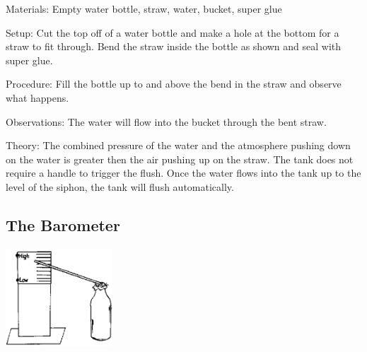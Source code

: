 \begin{multicols}{2}
\begin{description*}
\item[Materials:]{Empty water bottle, straw, water, bucket, super glue}
\item[Setup:]{Cut the top off of a water bottle and make a hole at the bottom for a straw to fit through. Bend the straw inside the bottle as shown and seal with super glue.}
\item[Procedure:]{Fill the bottle up to and above the bend in the straw and observe what happens.}
\item[Observations:]{The water will flow into the bucket through the bent straw.}
\item[Theory:]{The combined pressure of the water and the atmosphere pushing down on the water is greater then the air pushing up on the straw. The tank does not require a handle to trigger the flush. Once the water flows into the tank up to the level of the siphon, the tank will flush automatically. }
\end{description*}

\columnbreak

\subsection{The Barometer} 

\begin{center}
\includegraphics[width=0.3\textwidth]{./img/source/barometer.png}
\end{center}


\end{multicols}
